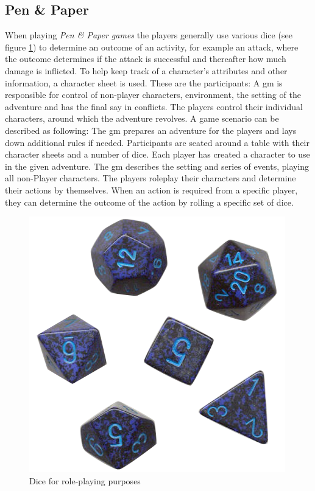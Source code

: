 \subsection{Pen \& Paper}
When playing \emph{Pen \& Paper games} the players generally use various dice (see figure \ref{dice}) to determine an outcome of an activity, for example an attack, where the outcome determines if the attack is successful and thereafter how much damage is inflicted. To help keep track of a character's attributes and other information, a character sheet is used.
These are the participants: A \ac{gm} is responsible for control of non-player characters, environment, the setting of the adventure and has the final say in conflicts. The players control their individual characters, around which the adventure revolves.
A game scenario can be described as following: The \ac{gm} prepares an adventure for the players and lays down additional rules if needed. Participants are seated around a table with their character sheets and a number of dice. Each player has created a character to use in the given adventure. The \ac{gm} describes the setting and series of events, playing all non-Player characters. The players roleplay their characters and determine their actions by themselves. When an action is required from a specific player, they can determine the outcome of the action by rolling a specific set of dice.
\begin{figure}[!h]
\centering
\includegraphics[scale=0.35]{img/rpgdice.png}
\caption{Dice for role-playing purposes}
\label{dice}
\end{figure}

